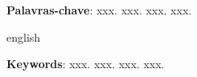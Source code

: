 

\setlength{\absparsep}{18pt}
\begin{resumo}
  \lipsum[1]

  \textbf{Palavras-chave}: xxx. xxx. xxx. xxx.
\end{resumo}

\begin{resumo}[Abstract]
  \begin{otherlanguage*}{english}
    
    \lipsum[1]
    \vspace{\onelineskip}
 
    \noindent 
    \textbf{Keywords}: xxx. xxx. xxx. xxx.
  \end{otherlanguage*}
\end{resumo}

\listoffigures*
\cleardoublepage


\listoftables*
\cleardoublepage



\tableofcontents*
\cleardoublepage

\textual
\pagestyle{simple}